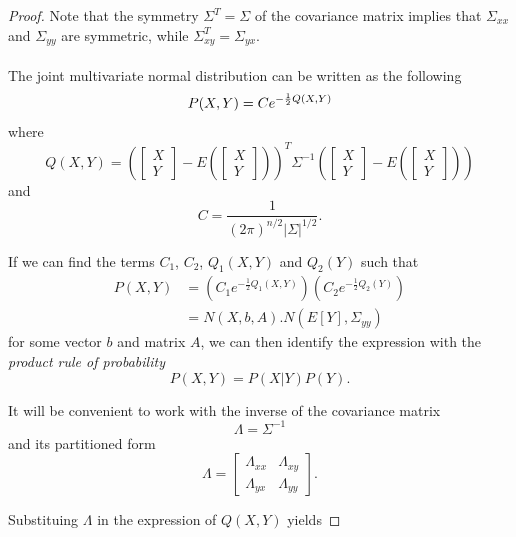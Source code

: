 \documentclass{article}
\theoremstyle{definition}
\theoremstyle{remark}
\begin{document}
\begin{proof}
Note that the symmetry $\Sigma^T=\Sigma$ of the covariance matrix implies that $\Sigma_{xx}$ and $\Sigma_{yy}$ are symmetric, while $\Sigma_{xy}^T=\Sigma_{yx}$.\\
\\
The joint multivariate normal distribution can be written as the following
$$P(X,Y)=Ce^{-\frac{1}{2}Q(X,Y)}\\$$
where
$$Q(X,Y)=\left(\begin{bmatrix} X\\ Y \end{bmatrix}-E\left( \begin{bmatrix} X\\ Y \end{bmatrix} \right)\right)^T
\Sigma^{-1}
\left(\begin{bmatrix} X\\ Y \end{bmatrix}-E\left( \begin{bmatrix} X\\ Y \end{bmatrix} \right)\right)$$
and
$$C=\frac{1}{(2\pi)^{n/2}|\Sigma|^{1/2}}.$$

If we can find the terms $C_1$, $C_2$, $Q_1(X,Y)$ and $Q_2(Y)$ such that %
\begin{align*}
P(X,Y)&=\left( C_1e^{-\frac{1}{2}Q_1(X,Y)}\right) \left( C_2e^{-\frac{1}{2}Q_2(Y)} \right)\\
&=N(X,b,A).N(E[Y],\Sigma_{yy})
\end{align*}
for some vector $b$ and matrix $A$, 
we can then identify the expression with the \textit{product rule of probability}
$$P(X,Y)=P(X|Y)P(Y).$$

It will be convenient to work with the inverse of the covariance matrix
$$\Lambda=\Sigma^{-1}$$ and its partitioned form
$$\Lambda=\begin{bmatrix}
\Lambda_{xx} & \Lambda_{xy}\\ 
\Lambda_{yx} & \Lambda_{yy}
\end{bmatrix}.$$

Substituing $\Lambda$ in the expression of $Q(X,Y)$ yields


\end{proof}
\end{document}
